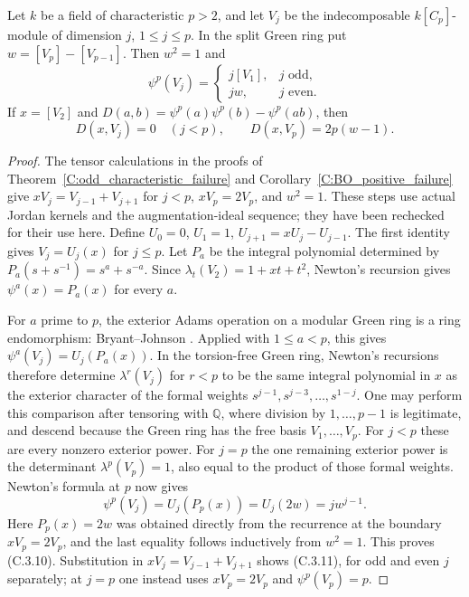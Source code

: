 \begin{lemma}
\label{C:Jordan_Adams_p}
Let $k$ be a field of characteristic $p>2$, and let $V_j$ be the
indecomposable $k[C_p]$-module of dimension $j$, $1\leq j\leq p$.
In the split Green ring put $w=[V_p]-[V_{p-1}]$. Then $w^2=1$ and
\[
 \psi^p(V_j)=\begin{cases}j[V_1],&j\text{ odd},\\jw,&j\text{ even}.
 \end{cases}                                                   \tag{C.3.10}
\]
If $x=[V_2]$ and $D(a,b)=\psi^p(a)\psi^p(b)-\psi^p(ab)$, then
\[
 D(x,V_j)=0\quad(j<p),\qquad D(x,V_p)=2p(w-1).             \tag{C.3.11}
\]
\end{lemma}
\begin{proof}
The tensor calculations in the proofs of
Theorem~\ref{C:odd_characteristic_failure} and
Corollary~\ref{C:BO_positive_failure} give
$xV_j=V_{j-1}+V_{j+1}$ for $j<p$, $xV_p=2V_p$, and $w^2=1$.
These steps use actual Jordan kernels and the augmentation-ideal sequence;
they have been rechecked for their use here.
Define $U_0=0$, $U_1=1$, $U_{j+1}=xU_j-U_{j-1}$.
The first identity gives $V_j=U_j(x)$ for $j\leq p$.
Let $P_a$ be the integral polynomial determined by
$P_a(s+s^{-1})=s^a+s^{-a}$. Since $\lambda_t(V_2)=1+xt+t^2$,
Newton's recursion gives $\psi^a(x)=P_a(x)$ for every $a$.

For $a$ prime to $p$, the exterior Adams operation on a modular Green
ring is a ring endomorphism: Bryant--Johnson
\cite[Proposition 2.1]{C-BryantJohnson2011}. Applied with $1\leq a<p$,
this gives $\psi^a(V_j)=U_j(P_a(x))$.
In the torsion-free Green ring, Newton's recursions therefore determine
$\lambda^r(V_j)$ for $r<p$ to be the same integral polynomial in $x$
as the exterior character of the formal weights
$s^{j-1},s^{j-3},\ldots,s^{1-j}$. One may perform this comparison after
tensoring with $\mathbb Q$, where division by $1,\ldots,p-1$ is legitimate,
and descend because the Green ring has the free basis $V_1,\ldots,V_p$.
For $j<p$ these are every nonzero exterior power. For $j=p$ the one
remaining exterior power is the determinant $\lambda^p(V_p)=1$, also
equal to the product of those formal weights. Newton's formula at $p$
now gives
\[
 \psi^p(V_j)=U_j(P_p(x))=U_j(2w)=j w^{j-1}.
\]
Here $P_p(x)=2w$ was obtained directly from the recurrence at the boundary
$xV_p=2V_p$, and the last equality follows inductively from $w^2=1$.
This proves (C.3.10). Substitution in $xV_j=V_{j-1}+V_{j+1}$ shows
(C.3.11), for odd and even $j$ separately; at $j=p$ one instead uses
$xV_p=2V_p$ and $\psi^p(V_p)=p$.
\end{proof}

